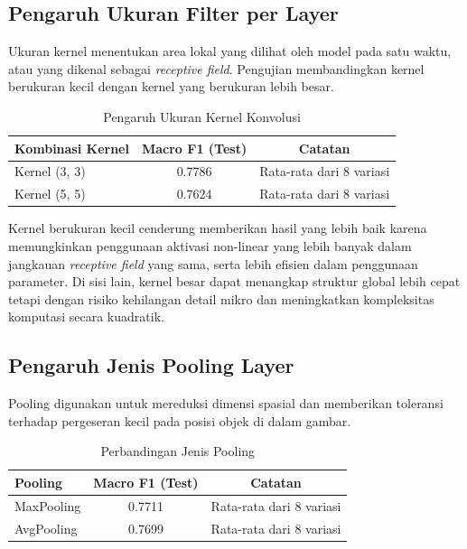 \subsection{Pengaruh Ukuran Filter per Layer}

Ukuran kernel menentukan area lokal yang dilihat oleh model pada satu waktu, atau yang dikenal sebagai \textit{receptive field}. Pengujian membandingkan kernel berukuran kecil dengan kernel yang berukuran lebih besar.

\begin{table}[H]
	\centering
	\caption{Pengaruh Ukuran Kernel Konvolusi}
	\begin{tabular}{lcc}
		\toprule
		\textbf{Kombinasi Kernel} & \textbf{Macro F1 (Test)} & \textbf{Catatan} \\
		\midrule
		Kernel (3, 3) & 0.7786 & Rata-rata dari 8 variasi \\
		Kernel (5, 5) & 0.7624 & Rata-rata dari 8 variasi \\
		\bottomrule
	\end{tabular}
	\label{tab:cnn-var-kernel-size}
\end{table}

Kernel berukuran kecil cenderung memberikan hasil yang lebih baik karena memungkinkan penggunaan aktivasi non-linear yang lebih banyak dalam jangkauan \textit{receptive field} yang sama, serta lebih efisien dalam penggunaan parameter. Di sisi lain, kernel besar dapat menangkap struktur global lebih cepat tetapi dengan risiko kehilangan detail mikro dan meningkatkan kompleksitas komputasi secara kuadratik.

\subsection{Pengaruh Jenis Pooling Layer}

Pooling digunakan untuk mereduksi dimensi spasial dan memberikan toleransi terhadap pergeseran kecil pada posisi objek di dalam gambar.

\begin{table}[H]
	\centering
	\caption{Perbandingan Jenis Pooling}
	\begin{tabular}{lcc}
		\toprule
		\textbf{Pooling} & \textbf{Macro F1 (Test)} & \textbf{Catatan} \\
		\midrule
		MaxPooling & 0.7711 & Rata-rata dari 8 variasi \\
		AvgPooling & 0.7699 & Rata-rata dari 8 variasi \\
		\bottomrule
	\end{tabular}
	\label{tab:cnn-var-pooling}
\end{table}

